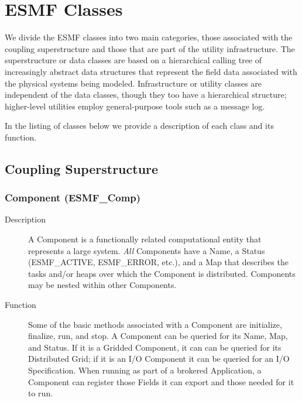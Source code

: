 \section{ESMF Classes}

We divide the ESMF classes into two main categories, those associated with the coupling 
superstructure and those that are part of the utility infrastructure.  The superstructure or data 
classes are based on a hierarchical 
calling tree of increasingly abstract data structures that represent the field data associated 
with the physical systems being modeled.  Infrastructure or utility classes are independent 
of the data classes, though they too have a hierarchical structure; higher-level utilities
employ general-purpose tools such as a message log.

In the listing of classes below we provide a description of each class and its function.

\subsection{Coupling Superstructure}

\subsubsection{Component (ESMF\_Comp)} 
\begin{description}
\item [Description] A Component is a functionally related computational entity that represents 
a large system.  {\it All} Components have a Name, a Status (ESMF\_ACTIVE, ESMF\_ERROR, etc.), and a Map that 
describes the tasks and/or heaps over which the Component is distributed.  Components may be 
nested within other Components.
\item [Function] Some of the basic methods associated with a Component are
initialize, finalize, run, and stop.  A Component can be queried for its Name, Map, and Status.  If it is a Gridded Component, it can can be queried for its Distributed Grid; if it is an I/O Component it can be queried for an I/O
Specification.  When running as part of a brokered Application, a Component can 
register those Fields it can export and those needed for it to run.
\end{description}

